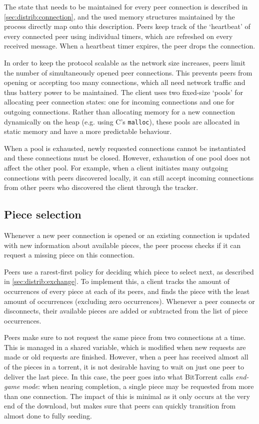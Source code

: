 The state that needs to be maintained for every peer connection is described in \ref{sec:distrib:connection}, and the used memory structures maintained by the process directly map onto this description. Peers keep track of the `heartbeat' of every connected peer using individual timers, which are refreshed on every received message. When a heartbeat timer expires, the peer drops the connection.

In order to keep the protocol scalable as the network size increases, peers limit the number of simultaneously opened peer connections. This prevents peers from opening or accepting too many connections, which all need network traffic and thus battery power to be maintained. The client uses two fixed-size `pools' for allocating peer connection states: one for incoming connections and one for outgoing connections. Rather than allocating memory for a new connection dynamically on the heap (e.g. using C's \texttt{malloc}), these pools are allocated in static memory and have a more predictable behaviour.

When a pool is exhausted, newly requested connections cannot be instantiated and these connections must be closed. However, exhaustion of one pool does not affect the other pool. For example, when a client initiates many outgoing connections with peers discovered locally, it can still accept incoming connections from other peers who discovered the client through the tracker.

\subsection{Piece selection}
Whenever a new peer connection is opened or an existing connection is updated with new information about available pieces, the peer process checks if it can request a missing piece on this connection.

Peers use a rarest-first policy for deciding which piece to select next, as described in \ref{sec:distrib:exchange}. To implement this, a client tracks the amount of occurrences of every piece at each of its peers, and finds the piece with the least amount of occurrences (excluding zero occurrences). Whenever a peer connects or disconnects, their available pieces are added or subtracted from the list of piece occurrences.

Peers make sure to not request the same piece from two connections at a time. This is managed in a shared variable, which is modified when new requests are made or old requests are finished. However, when a peer has received almost all of the pieces in a torrent, it is not desirable having to wait on just one peer to deliver the last piece. In this case, the peer goes into what BitTorrent calls \emph{end-game mode}: when nearing completion, a single piece may be requested from more than one connection. The impact of this is minimal as it only occurs at the very end of the download, but makes sure that peers can quickly transition from almost done to fully seeding.

